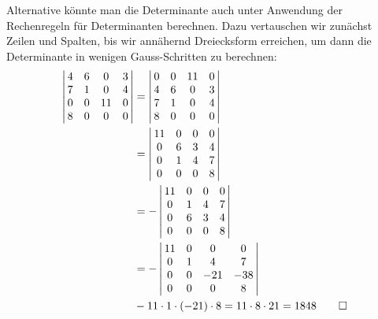 \begin{loesung}
Alternative könnte man die Determinante auch unter Anwendung der
Rechenregeln für Determinanten berechnen. Dazu vertauschen wir
zunächst Zeilen und Spalten, bis wir annähernd Dreiecksform erreichen,
um dann die Determinante in wenigen Gauss-Schritten zu berechnen:
\begin{align*}
\left|\,\begin{matrix}
4&6& 0&3\\
7&1& 0&4\\
0&0&11&0\\
8&0& 0&0
\end{matrix}\,\right|
&=
\left|\,\begin{matrix}
0&0&11&0\\
4&6& 0&3\\
7&1& 0&4\\
8&0& 0&0
\end{matrix}\,\right|
\\
&=
\left|\,\begin{matrix}
11&0&0&0\\
 0&6&3&4\\
 0&1&4&7\\
 0&0&0&8
\end{matrix}\,\right|\\
&=
-\left|\,\begin{matrix}
11&0&0&0\\
 0&1&4&7\\
 0&6&3&4\\
 0&0&0&8
\end{matrix}\,\right|\\
&=
-\left|\,\begin{matrix}
11&0&  0&  0\\
 0&1&  4&  7\\
 0&0&-21&-38\\
 0&0&  0&  8
\end{matrix}\,\right|\\
&-11\cdot 1\cdot (-21)\cdot 8=11\cdot 8\cdot 21=1848
\qedhere
\end{align*}
\end{loesung}
